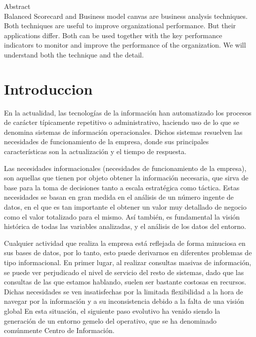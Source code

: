 



 Abstract\\
Balanced Scorecard and Business model canvas are business analysis techniques. Both techniques are useful to improve organizational performance. But their applications differ. Both can be used together with the key performance indicators to monitor and improve the performance of the organization. We will understand both the technique and the detail.
\newpage

\section{Introduccion}
En la actualidad, las tecnologías de la información han automatizado los procesos de carácter típicamente repetitivo o administrativo, haciendo uso de lo que se denomina sistemas de información operacionales. Dichos sistemas resuelven las necesidades de funcionamiento de la empresa, donde sus principales características son la actualización y el tiempo de respuesta. 

Las necesidades informacionales (necesidades de funcionamiento de la empresa), son aquellas que tienen por objeto obtener la información necesaria, que sirva de base para la toma de decisiones tanto a escala estratégica como táctica. Estas necesidades se basan en gran medida en el análisis de un número ingente de datos, en el que es tan importante el obtener un valor muy detallado de negocio como el valor totalizado para el mismo. Así también, es fundamental la visión histórica de todas las variables analizadas, y el análisis de los datos del entorno. 

Cualquier actividad que realiza la empresa está reflejada de forma minuciosa en sus bases de datos, por lo tanto, esto puede derivarnos en diferentes problemas de tipo informacional. En primer lugar, al realizar consultas masivas de información, se puede ver perjudicado el nivel de servicio del resto de sistemas, dado que las consultas de las que estamos hablando, suelen ser bastante costosas en recursos. Dichas necesidades se ven insatisfechas por la limitada flexibilidad a la hora de navegar por la información y a su inconsistencia debido a la falta de una visión global En esta situación, el siguiente paso evolutivo ha venido siendo la generación de un entorno gemelo del operativo, que se ha denominado comúnmente Centro de Información. 

